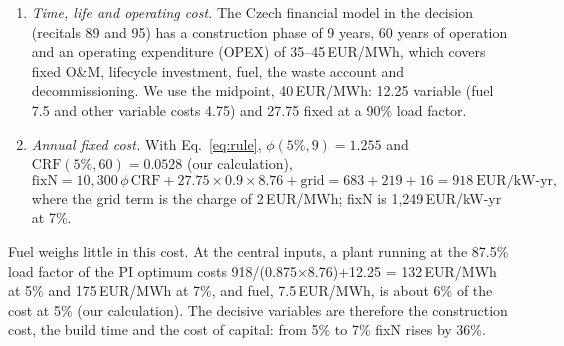 \begin{enumerate}
\item \emph{Time, life and operating cost.} The Czech financial model in the decision (recitals 89 and 95) has a construction phase of 9 years, 60 years of operation and an operating expenditure (OPEX) of 35--45\,EUR/MWh, which covers fixed O\&M, lifecycle investment, fuel, the waste account and decommissioning. We use the midpoint, 40\,EUR/MWh: 12.25 variable (fuel 7.5 and other variable costs 4.75) and 27.75 fixed at a 90\% load factor.
\item \emph{Annual fixed cost.} With Eq.~\eqref{eq:rule}, $\phi(5\%,9)=1.255$ and $\mathrm{CRF}(5\%,60)=0.0528$ (our calculation),
\begin{equation}
\mathrm{fixN}=10{,}300\,\phi\,\mathrm{CRF}+27.75\times0.9\times8.76+\text{grid}=683+219+16=918\ \mathrm{EUR/kW\text{-}yr},
\end{equation}
where the grid term is the charge of 2\,EUR/MWh; fixN is 1{,}249\,EUR/kW-yr at 7\%.
\end{enumerate}
Fuel weighs little in this cost. At the central inputs, a plant running at the 87.5\% load factor of the PI optimum costs 918/(0.875$\times$8.76)+12.25 = 132\,EUR/MWh at 5\% and 175\,EUR/MWh at 7\%, and fuel, 7.5\,EUR/MWh, is about 6\% of the cost at 5\% (our calculation). The decisive variables are therefore the construction cost, the build time and the cost of capital: from 5\% to 7\% fixN rises by 36\%.

